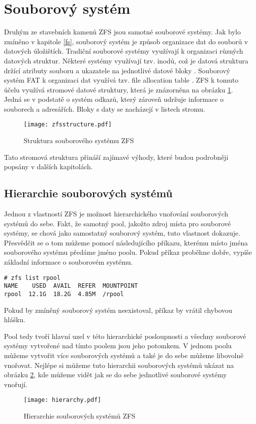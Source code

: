\section{Souborový systém}
Druhým ze stavebních kamenů ZFS jsou samotné souborové systémy. Jak bylo zmíněno v kapitole \ref{fs}, souborový systém je způsob organizace dat do souborů v datových úložištích.
Tradiční souborové systémy využívají k organizaci různých datových struktur. Některé systémy využívají tzv. inodů, což je datová struktura držící atributy souboru a ukazatele na jednotlivé datové bloky \cite{fs}. Souborový systém FAT k organizaci dat využívá tzv. file allocation table \cite{fs}. ZFS k tomuto účelu využívá stromové datové struktury, která je znázorněna na obrázku \ref{structure}. Jedná se v podstatě o systém odkazů, který zároveň udržuje informace o souborech a adresářích. Bloky s daty se nacházejí v listech stromu.
\begin{figure}[!h]
    \caption{Struktura souborového systému ZFS}
    \label{structure}
    \centering
    \texttt{[image: zfsstructure.pdf]}
\end{figure}

Tato stromová struktura přináší zajímavé výhody, které budou podrobněji popsány v dalších kapitolách.

\subsection{Hierarchie souborových systémů}
\label{hiararchy}
Jednou z vlastností ZFS je možnost hierarchického vnořování souborových systémů do sebe. Fakt, že samotný pool, jakožto zdroj místa pro souborové systémy, se chová jako samostatný souborový systém, tuto vlastnost dokazuje. Přesvědčit se o tom můžeme pomocí následujícího příkazu, kterému místo jména souborového systému předáme jméno poolu. Pokud příkaz proběhne dobře, vypíše základní informace o souborovém systému.
\begin{verbatim}
# zfs list rpool
NAME    USED  AVAIL  REFER  MOUNTPOINT
rpool  12.1G  18.2G  4.85M  /rpool
\end{verbatim}
Pokud by zmíněný souborový systém neexistoval, příkaz by vrátil chybovou hlášku.

Pool tedy tvoří hlavní uzel v této hierarchické posloupnosti a všechny souborové systémy vytvořené nad tímto poolem jsou jeho potomkem. V jednom poolu můžeme vytvořit více souborových systémů a také je do sebe můžeme libovolně vnořovat. Nejlépe si můžeme tuto hierarchii souborových systémů ukázat na obrázku \ref{fshierarchy}, kde můžeme vidět jak se do sebe jednotlivé souborové systémy vnořují.
\begin{figure}[h]
    \caption{Hierarchie souborových systémů ZFS}
    \label{fshierarchy}
    \centering
    \texttt{[image: hierarchy.pdf]}
\end{figure}

